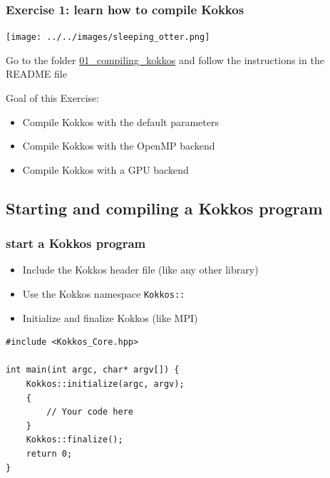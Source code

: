 \documentclass[aspectratio=169]{beamer}
\begin{document}
\begin{frame}[fragile]
    \frametitle{Exercise 1: learn how to compile Kokkos}

    \begin{center}
    \texttt{[image: ../../images/sleeping\_otter.png]}
    \end{center}

    Go to the folder \href{https://github.com/CExA-project/cexa-kokkos-tutorials/tree/main/exercises/01_compiling_kokkos}{01\_compiling\_kokkos} and follow the instructions in the README file

    Goal of this Exercise:
    \begin{itemize}
        \item Compile Kokkos with the default parameters
        \item Compile Kokkos with the OpenMP backend
        \item Compile Kokkos with a GPU backend
    \end{itemize}

\end{frame}


\subsection[Starting a Kokkos program]{Starting and compiling a Kokkos program}


\begin{frame}[fragile]
    \frametitle{start a Kokkos program} 
    \begin{itemize}
        \item Include the Kokkos header file (like any other library)
        \item Use the Kokkos namespace \texttt{Kokkos::}
        \item Initialize and finalize Kokkos (like MPI)
    \end{itemize}

\begin{verbatim}
#include <Kokkos_Core.hpp>

int main(int argc, char* argv[]) {
    Kokkos::initialize(argc, argv);
    {
        // Your code here
    }
    Kokkos::finalize();
    return 0;
}
\end{verbatim}

\end{frame}
\end{document}
